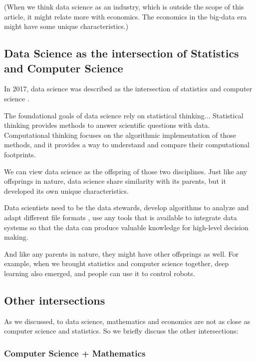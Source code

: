 (When we think data science as an industry, which is outside the scope of this article, it might relate more with economics. The economics in the big-data era might have some unique characteristics.)

\subsection*{Data Science as the intersection of Statistics and Computer Science}

In 2017, data science was described as the intersection of statistics and computer science \cite{blei_science_2017}.

\begin{displayquote}
The foundational goals of data science rely on statistical thinking...
Statistical thinking provides methods to answer scientific questions with data.
Computational thinking focuses on the algorithmic implementation of those methods, and it provides a way to understand and compare their computational footprints.
\end{displayquote}

We can view data science as the offspring of those two disciplines.
Just like any offsprings in nature, data science share similarity with its parents, but it developed its own unique characteristics.

Data scientists need to be the data stewards, develop algorithms to analyze and adapt different file formats \cite{mattmann_vision_2013}, use any tools that is available to integrate data systems so that the data can produce valuable knowledge for high-level decision making.

And like any parents in nature, they might have other offsprings as well. 
For example, when we brought statistics and computer science together, deep learning also emerged, and people can use it to control robots.

\subsection*{Other intersections}

As we discussed, to data science, mathematics and economics are not as close as computer science and statistics.
So we briefly discuss the other intersections:

\subsubsection*{Computer Science + Mathematics}

